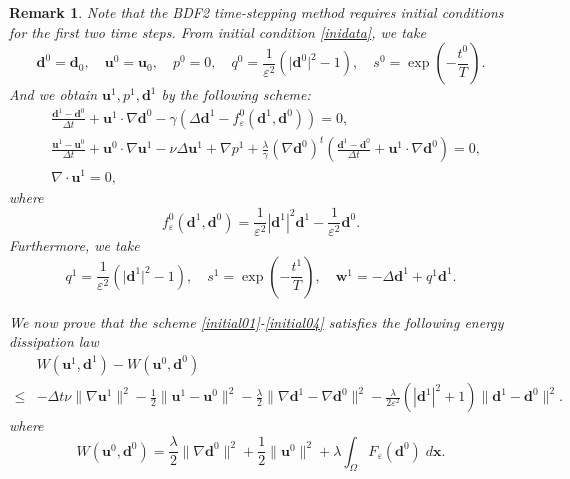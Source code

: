 \documentclass[12pt,reqno]{amsart}
\numberwithin{equation}{section}
\newtheorem{remark}{Remark}[section]
\newcommand{\uu}{\mathrm{\textbf{u}}}
\newcommand{\dd}{\mathrm{\textbf{d}}}
\newcommand{\ww}{\mathrm{\textbf{w}}}
\newcommand{\bx}{\mathrm{\textbf{x}}}
\begin{document}
\begin{remark}
Note that the BDF2 time-stepping method requires initial conditions for the first two time steps. From initial condition \eqref{inidata}, we take 
\begin{equation}\label{inidatadis}
\dd^0=\dd_0, \quad \uu^0=\uu_0,\quad p^0=0,\quad q^0=\frac{1}{\varepsilon^2}\left(\lvert\dd^0\rvert^2-1\right),\quad s^0=\exp\left(-\frac{t^{0}}{T}\right).
\end{equation}
And we obtain $\uu^1, p^1, \dd^1$ by the following scheme:
\begin{align}
&\frac{\dd^{1}-\dd^{0}}{\Delta t}+ \uu^{1}\cdot \nabla \dd^{0}-\gamma\left( \Delta \dd^{1}-f_{\varepsilon}^0(\dd^{1}, \dd^{0})\right)=0,\label{initial01}\\
&\frac{\uu^{1}-\uu^{0}}{\Delta t}+ \uu^{0}\cdot\nabla \uu^{1}-\nu \Delta \uu^{1}+\nabla p^{1} +\frac{\lambda}{\gamma}\left(\nabla\dd^{0}\right)^t\left(\frac{\dd^{1}-\dd^{0}}{\Delta t}+ \uu^{1}\cdot \nabla \dd^{0}\right)=0,\label{initial03}\\
&\nabla \cdot \uu^{1}=0,\label{initial04}
\end{align}
where 
\[f_{\varepsilon}^0(\dd^{1}, \dd^{0})=\frac{1}{\varepsilon^2}|\dd^{1}|^2\dd^{1}-\frac{1}{\varepsilon^2}\dd^0.\]
Furthermore, we take
$$q^1=\frac{1}{\varepsilon^2}\left(\lvert\dd^1\rvert^2-1\right),\quad s^1=\exp\left(-\frac{t^{1}}{T}\right), \quad \ww^1=-\Delta\dd^1+q^1\dd^1.$$

We now prove that the scheme \eqref{initial01}-\eqref{initial04} satisfies the following energy dissipation law
\begin{align}\label{1stenergy}
&W\left(\uu^{1},\dd^{1}\right)-W\left(\uu^{0},\dd^{0}\right)\nonumber
\\
\leq& -\Delta t\nu\lVert\nabla\uu^{1}\rVert^2-\frac{1}{2} \lVert \uu^{1}-\uu^0 \rVert^2
-\frac{\lambda}{2}\lVert \nabla\dd^{1}-\nabla\dd^0 \rVert^2-\frac{\lambda}{2\varepsilon^2}\left(|\dd^1|^2+1\right)\lVert\dd^1-\dd^0\rVert^2.
\end{align}
where 
$$W\left(\uu^{0},\dd^{0}\right)=\frac{\lambda}{2}\lVert\nabla\dd^0\rVert^2+\frac{1}{2}\lVert\uu^0\rVert^2+\lambda\int_\Omega F_\varepsilon(\dd^0)\;d\bx.$$


\end{remark}
\end{document}
